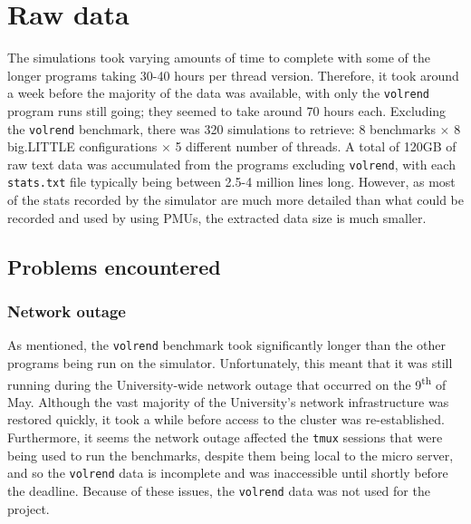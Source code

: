 \section{Raw data}
The simulations took varying amounts of time to complete with some of the longer
programs taking 30-40 hours per thread version. Therefore, it took around a week
before the majority of the data was available, with only the \texttt{volrend} 
program runs still going; they seemed to take around 70 hours each. Excluding 
the \texttt{volrend} benchmark, there was 320 simulations to retrieve: 8 
benchmarks $\times$ 8 big.LITTLE configurations $\times$ 5 different number of 
threads. A total of 120GB of raw text data was accumulated from the programs 
excluding \texttt{volrend}, with each \texttt{stats.txt} file typically being 
between 2.5-4 million lines long. However, as most of the stats recorded by the 
simulator are much more detailed than what could be recorded and used by using 
PMUs, the extracted data size is much smaller.

    \subsection{Problems encountered}
        \subsubsection{Network outage}
        As mentioned, the \texttt{volrend} benchmark took significantly longer 
        than the other programs being run on the simulator. Unfortunately, this 
        meant that it was still running during the University-wide network 
        outage that occurred on the 9\textsuperscript{th} of May. Although the 
        vast majority of the University's network infrastructure was restored 
        quickly, it took a while before access to the cluster was 
        re-established. Furthermore, it seems the network outage affected the 
        \texttt{tmux} sessions that were being used to run the benchmarks, 
        despite them being local to the micro server, and so the 
        \texttt{volrend} data is incomplete and was inaccessible until shortly 
        before the deadline. Because of these issues, the \texttt{volrend} data 
        was not used for the project.
    
